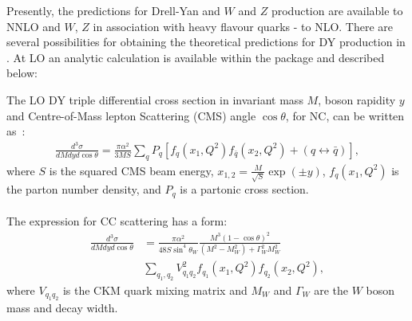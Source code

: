 Presently, the predictions for Drell-Yan and $W$ and $Z$ production are available
to NNLO and $W$, $Z$ in association with heavy flavour quarks - to NLO. There are several possibilities 
for obtaining the theoretical
predictions for DY production in \fitter. 
At LO an analytic calculation is available within the package and described
below: 

The LO DY triple differential cross section in
invariant mass \(M\), boson rapidity \(y\) and Centre-of-Mass 
lepton Scattering (CMS) angle \(\cos\theta\), for NC, 
can be written as~\cite{Drell:1970wh,Yamada:1981mw}:
\begin{align}
 \textstyle
 \frac{d^3\sigma}{dM{d}y d\cos\theta} =  
 \frac{\pi\alpha^2}{3MS}\sum_{q}P_q \left[f_q(x_1,Q^2)f_{\bar{q}}(x_2,Q^2) 
 + (q\leftrightarrow\bar{q})\right],
\end{align}
where \(S\) is the squared CMS beam energy, \(x_{1,2} = \frac{M}{\sqrt{S}}\exp(\pm y)\), $f_q(x_1,Q^2)$ 
is the parton number density, and 
$P_q$ is a partonic cross section. 
%
\\
\\
The expression for CC  scattering has a form:
\begin{align}
\frac{d^3\sigma}{dMdyd\cos\theta} &=
 \frac{\pi\alpha^2}{48S\sin^4\theta_W}
 \frac{M^3(1-\cos\theta)^2}{(M^2-M_W^2)+\Gamma_W^2M_W^2}  \nonumber \\
 & \sum_{q_1,q_2}V_{q_1q_2}^2f_{q_1}(x_1,Q^2)f_{q_2}(x_2,Q^2),
\end{align}
where \(V_{q_1q_2}\) is the CKM quark mixing matrix and \(M_W\) and \(\Gamma_W\)
are the \(W\) boson mass and decay width.

